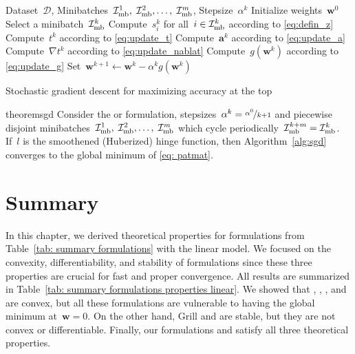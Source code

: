 \begin{algorithm}
  \begin{algorithmic}[1]
    \Require Dataset~$\mathcal{D}$, Minibatches~$\mathcal{I}_{\text{mb}}^1,\; \mathcal{I}_{\text{mb}}^2, \ldots, \; \mathcal{I}_{\text{mb}}^m$, Stepsize~$\alpha^k$
    \State Initialize weights~$\bm{w}^0$
    \State Select a minibatch~$\mathcal{I}_{\text{mb}}^k$
    \State Compute~$s_i^k$ for all~$i \in \mathcal{I}_{\text{mb}}^k$ according to \eqref{eq:defin_z}
    \State Compute~$t^k$ according to \eqref{eq:update_t}
    \State Compute~$\bm{a}^k$ according to \eqref{eq:update_a}
    \State Compute~$\nabla t^k$ according to \eqref{eq:update_nablat}
    \State Compute~$g(\bm{w}^k)$ according to \eqref{eq:update_g}
    \State Set~$\bm{w}^{k+1} \gets \bm{w}^k - \alpha^k g(\bm{w}^k)$
    \EndFor
  \end{algorithmic}
  \caption{Stochastic gradient descent for maximizing accuracy at the top}
  \label{alg:sgd}
\end{algorithm}

\begin{restatable}{theorem}{sgd}\label{thm:sgd}
  Consider the \PatMat or \PatMatNP formulation, stepsizes~$\alpha^k = \nicefrac{\alpha^0}{k+1}$ and piecewise disjoint minibatches~$\mathcal{I}_{\text{mb}}^1, \; \mathcal{I}_{\text{mb}}^2, \ldots, \; \mathcal{I}_{\text{mb}}^m$ which cycle periodically~$\mathcal{I}_{\text{mb}}^{k+m} = \mathcal{I}_{\text{mb}}^k$. If~$l$ is the smoothened (Huberized) hinge function, then Algorithm~\ref{alg:sgd} converges to the global minimum of \eqref{eq: patmat}.
\end{restatable}

\section{Summary}

In this chapter, we derived theoretical properties for formulations from Table~\ref{tab: summary formulations} with the linear model. We focused on the convexity, differentiability, and stability of formulations since these three properties are crucial for fast and proper convergence. All results are summarized in Table~\ref{tab: summary formulations properties linear}. We showed that \TopPush, \TopPushK, \TopMeanK, and \tauFPL are convex, but all these formulations are vulnerable to having the global minimum at~$\bm{w}=0$. On the other hand, Grill and \GrillNP are stable, but they are not convex or differentiable. Finally, our formulations \PatMat and \PatMatNP satisfy all three theoretical properties. 

